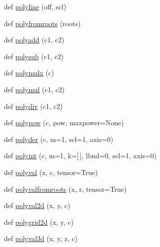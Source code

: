 \begin{DoxyCompactItemize}
\item 
def \hyperlink{namespacenumpy_1_1polynomial_1_1polynomial_abcebfe1fa5f34fc8f33af90043adeb5f}{polyline} (off, scl)
\item 
def \hyperlink{namespacenumpy_1_1polynomial_1_1polynomial_ac9af00aa52f5403bd83c41ba7f9fd0e2}{polyfromroots} (roots)
\item 
def \hyperlink{namespacenumpy_1_1polynomial_1_1polynomial_a06729bcbf68875802f1bb7f6d1b9196d}{polyadd} (c1, c2)
\item 
def \hyperlink{namespacenumpy_1_1polynomial_1_1polynomial_a933fc5794192da3624428289a5bf225a}{polysub} (c1, c2)
\item 
def \hyperlink{namespacenumpy_1_1polynomial_1_1polynomial_a41d8832845d385528e43af0cbe1b2ef2}{polymulx} (c)
\item 
def \hyperlink{namespacenumpy_1_1polynomial_1_1polynomial_aa293853d78763d5d30ba87f1be834dcc}{polymul} (c1, c2)
\item 
def \hyperlink{namespacenumpy_1_1polynomial_1_1polynomial_ad6246439a74b50540523347d1dbeb110}{polydiv} (c1, c2)
\item 
def \hyperlink{namespacenumpy_1_1polynomial_1_1polynomial_a2d46be6f41be6b0dd8959c1cf4cc0fc6}{polypow} (c, pow, maxpower=None)
\item 
def \hyperlink{namespacenumpy_1_1polynomial_1_1polynomial_a8d904fa6d68aa365f369e8aca05915f1}{polyder} (c, m=1, scl=1, axis=0)
\item 
def \hyperlink{namespacenumpy_1_1polynomial_1_1polynomial_a5e217368faff45af13299f379f16419f}{polyint} (c, m=1, k=\mbox{[}$\,$\mbox{]}, lbnd=0, scl=1, axis=0)
\item 
def \hyperlink{namespacenumpy_1_1polynomial_1_1polynomial_adb505068305c9e8c1b0d5b0eac04fe32}{polyval} (x, c, tensor=True)
\item 
def \hyperlink{namespacenumpy_1_1polynomial_1_1polynomial_a0e923b76cbaeab0257e4ce0e0867ee81}{polyvalfromroots} (x, r, tensor=True)
\item 
def \hyperlink{namespacenumpy_1_1polynomial_1_1polynomial_a508893c89ab3e00f61705e14b47a5110}{polyval2d} (x, y, c)
\item 
def \hyperlink{namespacenumpy_1_1polynomial_1_1polynomial_a8d8c5ed1aff8280b02907c8fa9c3305c}{polygrid2d} (x, y, c)
\item 
def \hyperlink{namespacenumpy_1_1polynomial_1_1polynomial_af5525861bf035f36104ee5e0f364506a}{polyval3d} (x, y, z, c)
\item 

\end{DoxyCompactItemize}
